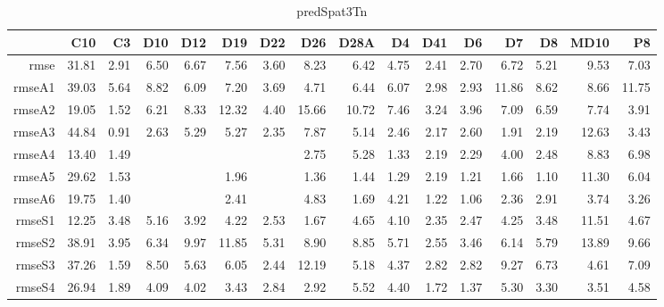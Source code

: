 \begin{table}[H]
\centering
\begin{tabular}{rrrrrrrrrrrrrrrr}
  \hline
 & C10 & C3 & D10 & D12 & D19 & D22 & D26 & D28A & D4 & D41 & D6 & D7 & D8 & MD10 & P8 \\ 
  \hline
rmse & 31.81 & 2.91 & 6.50 & 6.67 & 7.56 & 3.60 & 8.23 & 6.42 & 4.75 & 2.41 & 2.70 & 6.72 & 5.21 & 9.53 & 7.03 \\ 
  rmseA1 & 39.03 & 5.64 & 8.82 & 6.09 & 7.20 & 3.69 & 4.71 & 6.44 & 6.07 & 2.98 & 2.93 & 11.86 & 8.62 & 8.66 & 11.75 \\ 
  rmseA2 & 19.05 & 1.52 & 6.21 & 8.33 & 12.32 & 4.40 & 15.66 & 10.72 & 7.46 & 3.24 & 3.96 & 7.09 & 6.59 & 7.74 & 3.91 \\ 
  rmseA3 & 44.84 & 0.91 & 2.63 & 5.29 & 5.27 & 2.35 & 7.87 & 5.14 & 2.46 & 2.17 & 2.60 & 1.91 & 2.19 & 12.63 & 3.43 \\ 
  rmseA4 & 13.40 & 1.49 &  &  &  &  & 2.75 & 5.28 & 1.33 & 2.19 & 2.29 & 4.00 & 2.48 & 8.83 & 6.98 \\ 
  rmseA5 & 29.62 & 1.53 &  &  & 1.96 &  & 1.36 & 1.44 & 1.29 & 2.19 & 1.21 & 1.66 & 1.10 & 11.30 & 6.04 \\ 
  rmseA6 & 19.75 & 1.40 &  &  & 2.41 &  & 4.83 & 1.69 & 4.21 & 1.22 & 1.06 & 2.36 & 2.91 & 3.74 & 3.26 \\ 
  rmseS1 & 12.25 & 3.48 & 5.16 & 3.92 & 4.22 & 2.53 & 1.67 & 4.65 & 4.10 & 2.35 & 2.47 & 4.25 & 3.48 & 11.51 & 4.67 \\ 
  rmseS2 & 38.91 & 3.95 & 6.34 & 9.97 & 11.85 & 5.31 & 8.90 & 8.85 & 5.71 & 2.55 & 3.46 & 6.14 & 5.79 & 13.89 & 9.66 \\ 
  rmseS3 & 37.26 & 1.59 & 8.50 & 5.63 & 6.05 & 2.44 & 12.19 & 5.18 & 4.37 & 2.82 & 2.82 & 9.27 & 6.73 & 4.61 & 7.09 \\ 
  rmseS4 & 26.94 & 1.89 & 4.09 & 4.02 & 3.43 & 2.84 & 2.92 & 5.52 & 4.40 & 1.72 & 1.37 & 5.30 & 3.30 & 3.51 & 4.58 \\ 
   \hline
\end{tabular}
\caption{predSpat3Tn} 
\end{table}
